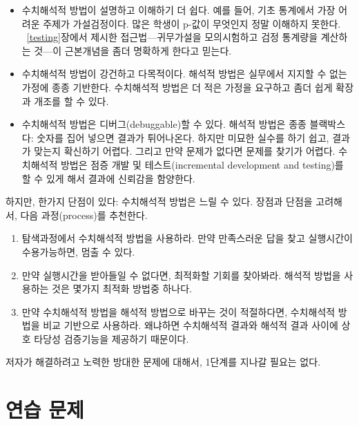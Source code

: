 \begin{itemize}

\item 수치해석적 방법이 설명하고 이해하기 더 쉽다. 예를 들어, 기초 통계에서 가장 어려운 주제가 가설검정이다. 많은 학생이 p-값이 무엇인지 정말 이해하지 못한다. ~\ref{testing}장에서 제시한 접근법---귀무가설을 모의시험하고 검정 통계량을 계산하는 것---이 근본개념을 좀더 명확하게 한다고 믿는다.

\item 수치해석적 방법이 강건하고 다목적이다. 해석적 방법은 실무에서 지지할 수 없는 가정에 종종 기반한다. 수치해석적 방법은 더 적은 가정을 요구하고 좀더 쉽게 확장과 개조를 할 수 있다.

\item 수치해석적 방법은 디버그(debuggable)할 수 있다. 해석적 방법은 종종 블랙박스다: 숫자를 집어 넣으면 결과가 튀어나온다. 하지만 미묘한 실수를 하기 쉽고, 결과가 맞는지 확신하기 어렵다. 그리고 만약 문제가 없다면 문제를 찾기가 어렵다. 수치해석적 방법은 점증 개발 및 테스트(incremental development and testing)를 할 수 있게 해서 결과에 신뢰감을 함양한다.

\end{itemize}

하지만, 한가지 단점이 있다: 수치해석적 방법은 느릴 수 있다.
장점과 단점을 고려해서, 다음 과정(process)를 추천한다.

\begin{enumerate}

\item 탐색과정에서 수치해석적 방법을 사용하라. 만약 만족스러운 답을 찾고 실행시간이 수용가능하면, 멈출 수 있다.

\item 만약 실행시간을 받아들일 수 없다면, 최적화할 기회를 찾아봐라. 해석적 방법을 사용하는 것은 몇가지 최적화 방법중 하나다.

\item 만약 수치해석적 방법을 해석적 방법으로 바꾸는 것이 적절하다면, 수치해석적 방법을 비교 기반으로 사용하라. 왜냐하면 수치해석적 결과와 해석적 결과 사이에 상호 타당성 검증기능을 제공하기 때문이다.

\end{enumerate}

저자가 해결하려고 노력한 방대한 문제에 대해서, 1단계를 지나갈 필요는 없다.


\section{연습 문제}

